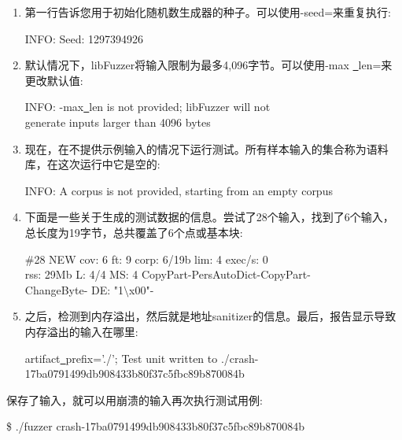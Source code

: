 \begin{enumerate}
\item 第一行告诉您用于初始化随机数生成器的种子。可以使用-seed=来重复执行:
\begin{tcolorbox}[colback=white,colframe=black]
INFO: Seed: 1297394926
\end{tcolorbox}

\item 默认情况下，libFuzzer将输入限制为最多4,096字节。可以使用-max \underline{~}len=来更改默认值:
\begin{tcolorbox}[colback=white,colframe=black]
INFO: -max\underline{~}len is not provided; libFuzzer will not \\
generate inputs larger than 4096 bytes
\end{tcolorbox}

\item 现在，在不提供示例输入的情况下运行测试。所有样本输入的集合称为语料库，在这次运行中它是空的:
\begin{tcolorbox}[colback=white,colframe=black]
INFO: A corpus is not provided, starting from an empty corpus
\end{tcolorbox}

\item 下面是一些关于生成的测试数据的信息。尝试了28个输入，找到了6个输入，总长度为19字节，总共覆盖了6个点或基本块:
\begin{tcolorbox}[colback=white,colframe=black]
\#28 NEW cov: 6 ft: 9 corp: 6/19b lim: 4 exec/s: 0 \\
rss: 29Mb L: 4/4 MS: 4 CopyPart-PersAutoDict-CopyPart- \\
ChangeByte- DE: "1$\setminus$x00"-
\end{tcolorbox}

\item 之后，检测到内存溢出，然后就是地址sanitizer的信息。最后，报告显示导致内存溢出的输入在哪里:
\begin{tcolorbox}[colback=white,colframe=black]
artifact\underline{~}prefix='./'; Test unit written to ./crash-17ba0791499db908433b80f37c5fbc89b87\allowbreak 0084b
\end{tcolorbox}

\end{enumerate}

保存了输入，就可以用崩溃的输入再次执行测试用例:\par

\begin{tcolorbox}[colback=white,colframe=black]
\$ ./fuzzer crash-17ba0791499db908433b80f37c5fbc89b870084b
\end{tcolorbox}

